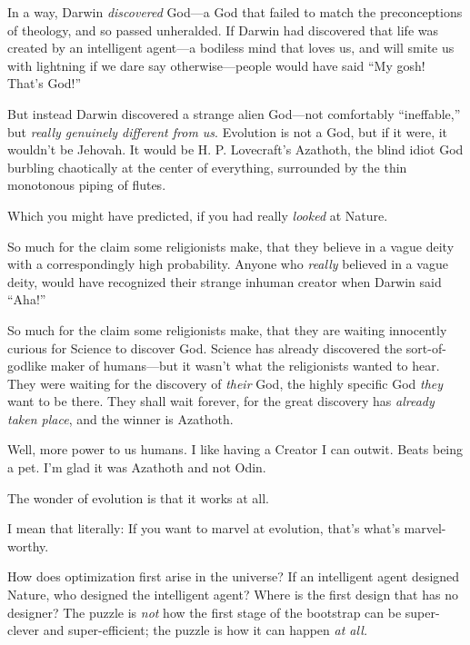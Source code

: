 {
 In a way, Darwin \textit{discovered} God---a God that failed to
match the preconceptions of theology, and so passed unheralded. If
Darwin had discovered that life was created by an intelligent agent---a
bodiless mind that loves us, and will smite us with lightning if we
dare say otherwise---people would have said ``My gosh!
That's God!''}

{
 But instead Darwin discovered a strange alien God---not
comfortably ``ineffable,'' but
\textit{really genuinely different from us}. Evolution is not a God,
but if it were, it wouldn't be Jehovah. It would be H.
P. Lovecraft's Azathoth, the blind idiot God burbling
chaotically at the center of everything, surrounded by the thin
monotonous piping of flutes.}

{
 Which you might have predicted, if you had really \textit{looked}
at Nature.}

{
 So much for the claim some religionists make, that they believe in
a vague deity with a correspondingly high probability. Anyone who
\textit{really} believed in a vague deity, would have recognized their
strange inhuman creator when Darwin said
``Aha!''}

{
 So much for the claim some religionists make, that they are
waiting innocently curious for Science to discover God. Science has
already discovered the sort-of-godlike maker of humans---but it
wasn't what the religionists wanted to hear. They were
waiting for the discovery of \textit{their} God, the highly specific
God \textit{they} want to be there. They shall wait forever, for the
great discovery has \textit{already taken place}, and the winner is
Azathoth.}

{
 Well, more power to us humans. I like having a Creator I can
outwit. Beats being a pet. I'm glad it was Azathoth and
not Odin.}

\myendsectiontext


\bigskip


{
 The wonder of evolution is that it works at all. }

{
 I mean that literally: If you want to marvel at evolution,
that's what's marvel-worthy.}

{
 How does optimization first arise in the universe? If an
intelligent agent designed Nature, who designed the intelligent agent?
Where is the first design that has no designer? The puzzle is
\textit{not} how the first stage of the bootstrap can be super-clever
and super-efficient; the puzzle is how it can happen \textit{at all.}}

